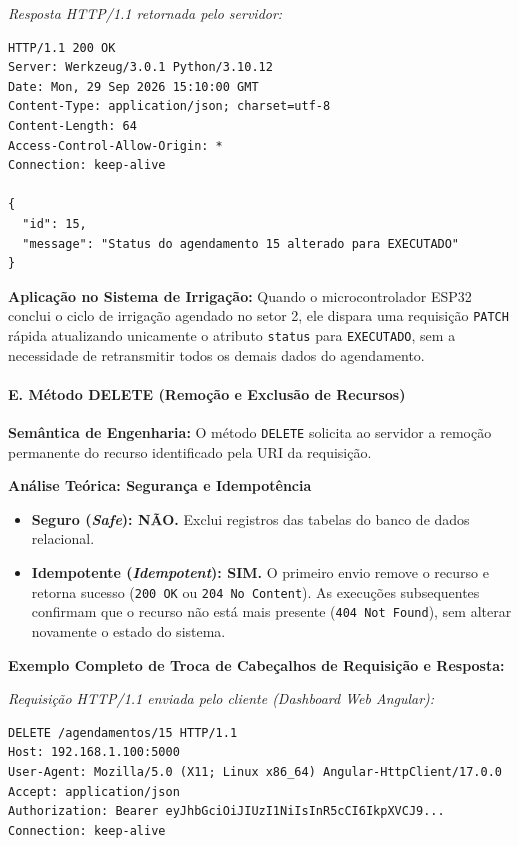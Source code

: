 \textit{Resposta HTTP/1.1 retornada pelo servidor:}
\begin{lstlisting}
HTTP/1.1 200 OK
Server: Werkzeug/3.0.1 Python/3.10.12
Date: Mon, 29 Sep 2026 15:10:00 GMT
Content-Type: application/json; charset=utf-8
Content-Length: 64
Access-Control-Allow-Origin: *
Connection: keep-alive

{
  "id": 15,
  "message": "Status do agendamento 15 alterado para EXECUTADO"
}
\end{lstlisting}

\textbf{Aplicação no Sistema de Irrigação:} Quando o microcontrolador ESP32 conclui o ciclo de irrigação agendado no setor 2, ele dispara uma requisição \texttt{PATCH} rápida atualizando unicamente o atributo \texttt{status} para \texttt{EXECUTADO}, sem a necessidade de retransmitir todos os demais dados do agendamento.

\paragraph*{E. Método DELETE (Remoção e Exclusão de Recursos)}

\textbf{Semântica de Engenharia:} O método \texttt{DELETE} solicita ao servidor a remoção permanente do recurso identificado pela URI da requisição. 

\textbf{Análise Teórica: Segurança e Idempotência}
\begin{itemize}
    \item \textbf{Seguro (\textit{Safe}): NÃO.} Exclui registros das tabelas do banco de dados relacional.
    \item \textbf{Idempotente (\textit{Idempotent}): SIM.} O primeiro envio remove o recurso e retorna sucesso (\texttt{200 OK} ou \texttt{204 No Content}). As execuções subsequentes confirmam que o recurso não está mais presente (\texttt{404 Not Found}), sem alterar novamente o estado do sistema.
\end{itemize}

\textbf{Exemplo Completo de Troca de Cabeçalhos de Requisição e Resposta:}

\textit{Requisição HTTP/1.1 enviada pelo cliente (Dashboard Web Angular):}
\begin{lstlisting}
DELETE /agendamentos/15 HTTP/1.1
Host: 192.168.1.100:5000
User-Agent: Mozilla/5.0 (X11; Linux x86_64) Angular-HttpClient/17.0.0
Accept: application/json
Authorization: Bearer eyJhbGciOiJIUzI1NiIsInR5cCI6IkpXVCJ9...
Connection: keep-alive


\end{lstlisting}

